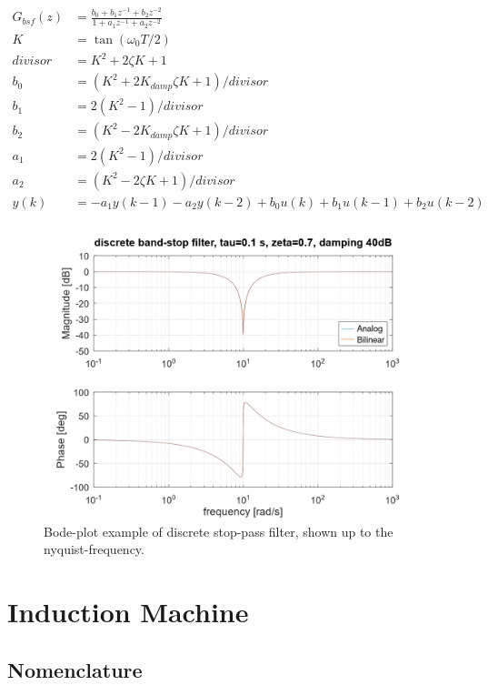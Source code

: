 \documentclass[]{book}
\begin{document}
\[
\begin{aligned}
G_{bsf}(z) &= \frac{b_0+b_1z^{-1}+b_2z^{-2}}{1+a_1z^{-1}+a_2z^{-2}} \\
K &= \tan(\omega_0 T/2) \\
divisor &= K^2+2\zeta K+1\\
b_0 &=  (K^2+2K_ {damp}\zeta K+1)/divisor\\
b_1 &=  2(K^2-1)/divisor\\
b_2 &=  (K^2-2K_ {damp}\zeta K+1)/divisor\\
a_1 &=  2(K^2-1)/divisor\\
a_2 &=  (K^2-2\zeta K+1)/divisor\\
y(k) &= -a_1y(k-1) -a_2 y(k-2) + b_0u(k)+ b_1u(k-1)+ b_2u(k-2) \\
\end{aligned}
\label{eq:dbsf2}
\]

\begin{figure}
\includegraphics[width=1\linewidth]{images/filters/bsf_disc} \caption{Bode-plot example of discrete stop-pass filter, shown up to the nyquist-frequency.}\label{fig:unnamed-chunk-11}
\end{figure}

\hypertarget{induction-machine}{%
\chapter{Induction Machine}\label{induction-machine}}

\hypertarget{nomenclature-1}{%
\section{Nomenclature}\label{nomenclature-1}}
\end{document}
